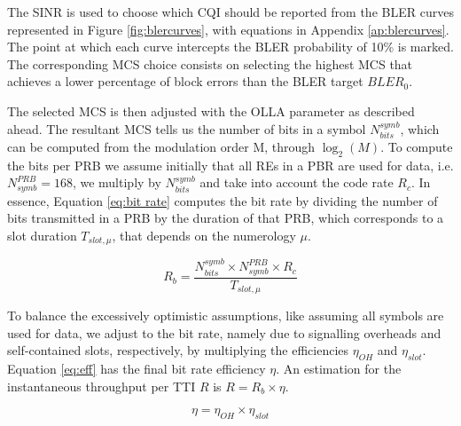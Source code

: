 The SINR is used to choose which CQI should be reported from the BLER curves represented in Figure \ref{fig:blercurves}, with equations in Appendix \ref{ap:blercurves}. The point at which each curve intercepts the BLER probability of 10\% is marked. The corresponding MCS choice consists on selecting the highest MCS that achieves a lower percentage of block errors than the \ac{BLER} target $BLER_0$.



The selected MCS is then adjusted with the OLLA parameter as described ahead. The resultant MCS tells us the number of bits in a symbol $N_{bits}^{symb}$, which can be computed from the modulation order M, through $\log_2(M)$. To compute the bits per PRB we assume initially that all REs in a PBR are used for data, i.e. $N_{symb}^{PRB} = 168$, we multiply by $N_{bits}^{symb}$ and take into account the code rate $R_c$. In essence, Equation \eqref{eq:bit rate} computes the bit rate by dividing the number of bits transmitted in a PRB by the duration of that PRB, which corresponds to a slot duration $T_{slot, \mu}$, that depends on the numerology $\mu$.

\begin{equation} \label{eq:bit rate}
    R_b = \frac{N_{bits}^{symb} \times N_{symb}^{PRB} \times R_{c}}{T_{slot, \mu}} 
\end{equation}

To balance the excessively optimistic assumptions, like assuming all symbols are used for data, we adjust to the bit rate, namely due to signalling overheads and self-contained slots, respectively, by multiplying the efficiencies $\eta_{OH}$ and $\eta_{slot}$. Equation \eqref{eq:eff} has the final bit rate efficiency $\eta$. An estimation for the instantaneous throughput per TTI $R$ is $R = R_b \times \eta$.


\begin{equation} \label{eq:eff}
    \eta = \eta_{OH} \times \eta_{slot}
\end{equation}




